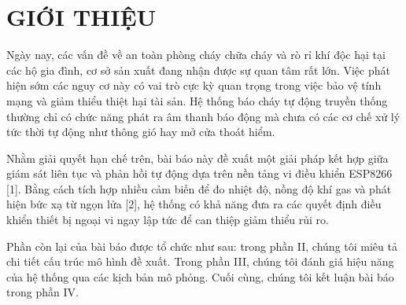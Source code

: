 \section{GIỚI THIỆU}
Ngày nay, các vấn đề về an toàn phòng cháy chữa cháy và rò rỉ khí độc hại tại các hộ gia đình, cơ sở sản xuất đang nhận được sự quan tâm rất lớn. Việc phát hiện sớm các nguy cơ này có vai trò cực kỳ quan trọng trong việc bảo vệ tính mạng và giảm thiểu thiệt hại tài sản. Hệ thống báo cháy tự động truyền thống thường chỉ có chức năng phát ra âm thanh báo động mà chưa có các cơ chế xử lý tức thời tự động như thông gió hay mở cửa thoát hiểm.

Nhằm giải quyết hạn chế trên, bài báo này đề xuất một giải pháp kết hợp giữa giám sát liên tục và phản hồi tự động dựa trên nền tảng vi điều khiển ESP8266 [1]. Bằng cách tích hợp nhiều cảm biến để đo nhiệt độ, nồng độ khí gas và phát hiện bức xạ từ ngọn lửa [2], hệ thống có khả năng đưa ra các quyết định điều khiển thiết bị ngoại vi ngay lập tức để can thiệp giảm thiểu rủi ro.

Phần còn lại của bài báo được tổ chức như sau: trong phần II, chúng tôi miêu tả chi tiết cấu trúc mô hình đề xuất. Trong phần III, chúng tôi đánh giá hiệu năng của hệ thống qua các kịch bản mô phỏng. Cuối cùng, chúng tôi kết luận bài báo trong phần IV.

